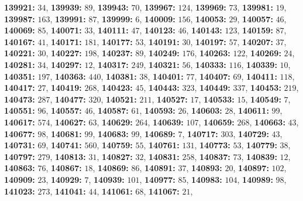 \textsf{\bfseries 139921:} $34$, \textsf{\bfseries 139939:} $89$, \textsf{\bfseries 139943:} $70$, \textsf{\bfseries 139967:} $124$, \textsf{\bfseries 139969:} $73$, \textsf{\bfseries 139981:} $19$, \textsf{\bfseries 139987:} $163$, \textsf{\bfseries 139991:} $87$, \textsf{\bfseries 139999:} $6$, \textsf{\bfseries 140009:} $156$, \textsf{\bfseries 140053:} $29$, \textsf{\bfseries 140057:} $46$, \textsf{\bfseries 140069:} $85$, \textsf{\bfseries 140071:} $33$, \textsf{\bfseries 140111:} $47$, \textsf{\bfseries 140123:} $46$, \textsf{\bfseries 140143:} $123$, \textsf{\bfseries 140159:} $87$, \textsf{\bfseries 140167:} $41$, \textsf{\bfseries 140171:} $181$, \textsf{\bfseries 140177:} $53$, \textsf{\bfseries 140191:} $30$, \textsf{\bfseries 140197:} $57$, \textsf{\bfseries 140207:} $37$, \textsf{\bfseries 140221:} $30$, \textsf{\bfseries 140227:} $198$, \textsf{\bfseries 140237:} $89$, \textsf{\bfseries 140249:} $176$, \textsf{\bfseries 140263:} $122$, \textsf{\bfseries 140269:} $24$, \textsf{\bfseries 140281:} $34$, \textsf{\bfseries 140297:} $12$, \textsf{\bfseries 140317:} $249$, \textsf{\bfseries 140321:} $56$, \textsf{\bfseries 140333:} $116$, \textsf{\bfseries 140339:} $10$, \textsf{\bfseries 140351:} $197$, \textsf{\bfseries 140363:} $440$, \textsf{\bfseries 140381:} $38$, \textsf{\bfseries 140401:} $77$, \textsf{\bfseries 140407:} $69$, \textsf{\bfseries 140411:} $118$, \textsf{\bfseries 140417:} $27$, \textsf{\bfseries 140419:} $268$, \textsf{\bfseries 140423:} $45$, \textsf{\bfseries 140443:} $323$, \textsf{\bfseries 140449:} $337$, \textsf{\bfseries 140453:} $219$, \textsf{\bfseries 140473:} $287$, \textsf{\bfseries 140477:} $320$, \textsf{\bfseries 140521:} $211$, \textsf{\bfseries 140527:} $17$, \textsf{\bfseries 140533:} $15$, \textsf{\bfseries 140549:} $7$, \textsf{\bfseries 140551:} $96$, \textsf{\bfseries 140557:} $46$, \textsf{\bfseries 140587:} $61$, \textsf{\bfseries 140593:} $26$, \textsf{\bfseries 140603:} $28$, \textsf{\bfseries 140611:} $99$, \textsf{\bfseries 140617:} $574$, \textsf{\bfseries 140627:} $63$, \textsf{\bfseries 140629:} $264$, \textsf{\bfseries 140639:} $107$, \textsf{\bfseries 140659:} $268$, \textsf{\bfseries 140663:} $43$, \textsf{\bfseries 140677:} $98$, \textsf{\bfseries 140681:} $99$, \textsf{\bfseries 140683:} $99$, \textsf{\bfseries 140689:} $7$, \textsf{\bfseries 140717:} $303$, \textsf{\bfseries 140729:} $43$, \textsf{\bfseries 140731:} $69$, \textsf{\bfseries 140741:} $560$, \textsf{\bfseries 140759:} $55$, \textsf{\bfseries 140761:} $131$, \textsf{\bfseries 140773:} $53$, \textsf{\bfseries 140779:} $38$, \textsf{\bfseries 140797:} $279$, \textsf{\bfseries 140813:} $31$, \textsf{\bfseries 140827:} $32$, \textsf{\bfseries 140831:} $258$, \textsf{\bfseries 140837:} $73$, \textsf{\bfseries 140839:} $12$, \textsf{\bfseries 140863:} $76$, \textsf{\bfseries 140867:} $18$, \textsf{\bfseries 140869:} $86$, \textsf{\bfseries 140891:} $37$, \textsf{\bfseries 140893:} $20$, \textsf{\bfseries 140897:} $102$, \textsf{\bfseries 140909:} $23$, \textsf{\bfseries 140929:} $7$, \textsf{\bfseries 140939:} $101$, \textsf{\bfseries 140977:} $85$, \textsf{\bfseries 140983:} $104$, \textsf{\bfseries 140989:} $98$, \textsf{\bfseries 141023:} $273$, \textsf{\bfseries 141041:} $44$, \textsf{\bfseries 141061:} $68$, \textsf{\bfseries 141067:} $21$, 
